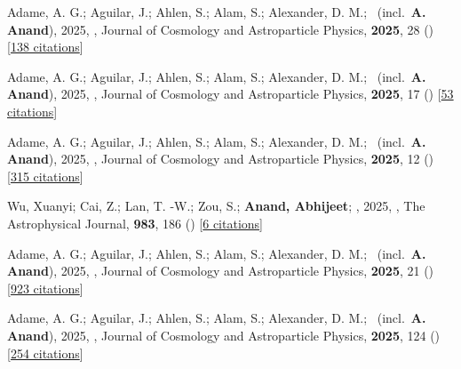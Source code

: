\item[{\color{numcolor}\scriptsize18}] Adame, A. G.; Aguilar, J.; Ahlen, S.; Alam, S.; Alexander, D. M.; \etal\ (incl.\ \textbf{A. Anand}), 2025, , Journal of Cosmology and Astroparticle Physics, \textbf{2025}, 28 () [\href{https://ui.adsabs.harvard.edu/abs/2025JCAP...07..028A}{138 citations}]

\item[{\color{numcolor}\scriptsize17}] Adame, A. G.; Aguilar, J.; Ahlen, S.; Alam, S.; Alexander, D. M.; \etal\ (incl.\ \textbf{A. Anand}), 2025, , Journal of Cosmology and Astroparticle Physics, \textbf{2025}, 17 () [\href{https://ui.adsabs.harvard.edu/abs/2025JCAP...07..017A}{53 citations}]

\item[{\color{numcolor}\scriptsize16}] Adame, A. G.; Aguilar, J.; Ahlen, S.; Alam, S.; Alexander, D. M.; \etal\ (incl.\ \textbf{A. Anand}), 2025, , Journal of Cosmology and Astroparticle Physics, \textbf{2025}, 12 () [\href{https://ui.adsabs.harvard.edu/abs/2025JCAP...04..012A}{315 citations}]

\item[{\color{numcolor}\scriptsize15}] Wu, Xuanyi; Cai, Z.; Lan, T. -W.; Zou, S.; \textbf{Anand, Abhijeet}; \etal, 2025, , The Astrophysical Journal, \textbf{983}, 186 () [\href{https://ui.adsabs.harvard.edu/abs/2025ApJ...983..186W}{6 citations}]

\item[{\color{numcolor}\scriptsize14}] Adame, A. G.; Aguilar, J.; Ahlen, S.; Alam, S.; Alexander, D. M.; \etal\ (incl.\ \textbf{A. Anand}), 2025, , Journal of Cosmology and Astroparticle Physics, \textbf{2025}, 21 () [\href{https://ui.adsabs.harvard.edu/abs/2025JCAP...02..021A}{923 citations}]

\item[{\color{numcolor}\scriptsize13}] Adame, A. G.; Aguilar, J.; Ahlen, S.; Alam, S.; Alexander, D. M.; \etal\ (incl.\ \textbf{A. Anand}), 2025, , Journal of Cosmology and Astroparticle Physics, \textbf{2025}, 124 () [\href{https://ui.adsabs.harvard.edu/abs/2025JCAP...01..124A}{254 citations}]

